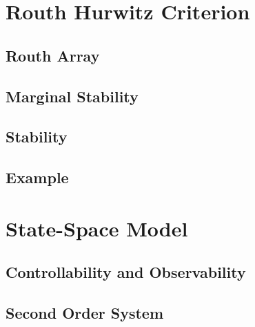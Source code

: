 \documentclass[journal,12pt,twocolumn]{IEEEtran}
\begin{document}
%

\section{Routh Hurwitz Criterion}

\subsection{Routh Array}

%

\subsection{Marginal Stability}

%

\subsection{Stability}



%

\subsection{Example}

%

%

\section{State-Space Model}

\subsection{Controllability and Observability}

%

%

\subsection{Second Order System}

%
\end{document}
